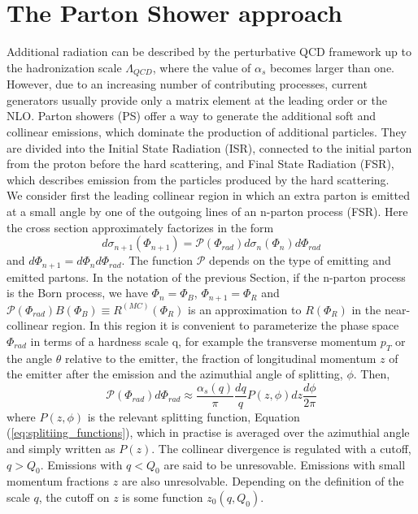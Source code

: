 \section{The Parton Shower approach}\label{sec:PS}
\noindent Additional radiation can be described by the perturbative QCD framework up to the hadronization scale $\Lambda_{QCD}$, where the value of $\alpha_s$ becomes larger than one. However, due to an increasing number of contributing processes, current generators usually provide only a matrix element at the leading order or the NLO. Parton showers (PS) offer a way to generate the additional soft and collinear emissions, which dominate the production of additional particles. They are divided into the Initial State Radiation (ISR), connected to the initial parton from the proton before the hard scattering, and Final State Radiation (FSR), which describes emission from the particles produced by the hard scattering.\\
\indent We consider first the leading collinear region in which an extra parton is emitted at a small angle by one of the outgoing lines of an n-parton process (FSR). Here the cross section approximately factorizes in the form
\begin{equation}\label{eq:PS_1}
    d\sigma_{n+1}(\Phi_{n+1}) = \mathscr{P}(\Phi_{rad}) d\sigma_n(\Phi_n)d\Phi_{rad}
\end{equation}
and $d\Phi_{n+1} = d\Phi_nd\Phi_{rad}$. The function $\mathscr{P}$ depends on the type of emitting and emitted partons. In the notation of the previous Section, if the n-parton process is the Born process, we have $\Phi_n = \Phi_B$, $\Phi_{n+1} = \Phi_R$ and $\mathscr{P}(\Phi_{rad})B(\Phi_B) \equiv R^{(MC)}(\Phi_R)$ is an approximation to $R(\Phi_R)$ in the near-collinear region. In this region it is convenient to parameterize the phase space $\Phi_{rad}$ in terms of a hardness scale q, for example the transverse momentum $p_T$ or the angle $\theta$ relative to the emitter, the fraction of longitudinal momentum $z$ of the emitter after the emission and the azimuthial angle of splitting, $\phi$. Then,
\begin{equation}\label{eq:PS_2}
    \mathscr{P}(\Phi_{rad})d\Phi_{rad} \approx \frac{\alpha_s(q)}{\pi}\frac{dq}{q}P(z,\phi)dz\frac{d\phi}{2\pi}
\end{equation}
where $P(z,\phi)$ is the relevant splitting function, Equation (\ref{eq:splitiing_functions}), which in practise is averaged over the azimuthial angle and simply written as $P(z)$. The collinear divergence is regulated with a cutoff, $q > Q_0$. Emissions with $q < Q_0$ are said to be unresovable. Emissions with small momentum fractions $z$ are also unresolvable. Depending on the definition of the scale $q$, the cutoff on $z$ is some function $z_0(q,Q_0)$.\\
